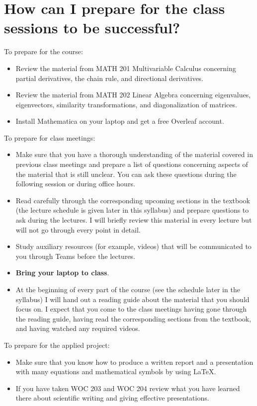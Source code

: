 \documentclass[11pt]{article}
\begin{document}

\section{How can I prepare for the class sessions to be successful?}

To prepare for the course:
\begin{itemize}[label={-},noitemsep]
\item Review the material from MATH 201 Multivariable Calculus concerning partial derivatives, the chain rule, and directional derivatives.
\item Review the material from MATH 202 Linear Algebra concerning eigenvalues, eigenvectors, similarity transformations, and diagonalization of matrices.
\item Install Mathematica on your laptop and get a free Overleaf account.
\end{itemize}

To prepare for class meetings:
\begin{itemize}[label={-},noitemsep]
\item Make sure that you have a thorough understanding of the material covered in previous class meetings and prepare a list of questions concerning aspects of the material that is still unclear. You can ask these questions during the following session or during office hours.
\item Read carefully through the corresponding upcoming sections in the textbook (the lecture schedule is given later in this syllabus) and prepare questions to ask during the lectures. I will briefly review this material in every lecture but will not go through every point in detail.  
\item Study auxiliary resources (for example, videos) that will be communicated to you through Teams before the lectures.
\item \textbf{Bring your laptop to class}.
\item At the beginning of every part of the course (see the schedule later in the syllabus) I will hand out a reading guide about the material that you should focus on. I expect that you come to the class meetings having gone through the reading guide, having read the corresponding sections from the textbook, and having watched any required videos.
\end{itemize}

To prepare for the applied project:
\begin{itemize}[label={-},noitemsep]
\item Make sure that you know how to produce a written report and a presentation with many equations and mathematical symbols by using LaTeX.
\item If you have taken WOC 203 and WOC 204 review what you have learned there about scientific writing and giving effective presentations.
\end{itemize}
\end{document}

